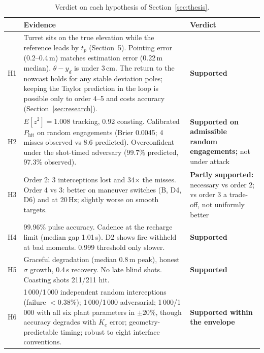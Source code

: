 \documentclass[11pt,a4paper]{article}
\newcommand{\Phit}{P_{\mathrm{hit}}}
\begin{document}
\begin{table}[H]
\centering\small
\caption{Verdict on each hypothesis of Section~\ref{sec:thesis}.}
\label{tab:verdict}
\begin{tabularx}{\textwidth}{@{}lXl@{}}
\toprule
& Evidence & Verdict\\
\midrule
H1 & Turret sits on the true elevation while the reference leads by $t_p$ (Section~5). Pointing error (0.2--0.4\,m) matches estimation error (0.22\,m median). $\theta-y_d$ is under 3\,cm. The return to the nowcast holds for any stable deviation poles; keeping the Taylor prediction in the loop is possible only to order 4--5 and costs accuracy (Section~\ref{sec:research}). & \textbf{Supported}\\
H2 & $E[z^2]=1.008$ tracking, 0.92 coasting. Calibrated $\Phit$ on random engagements (Brier 0.0045; 4 misses observed vs 8.6 predicted). Overconfident under the shot-timed adversary (99.7\% predicted, 97.3\% observed). & \textbf{Supported on admissible random engagements;} not under attack\\
H3 & Order 2: 3 interceptions lost and 34$\times$ the misses. Order 4 vs 3: better on maneuver switches (B, D4, D6) and at 20\,Hz; slightly worse on smooth targets. & \textbf{Partly supported:} necessary vs order 2; vs order 3 a trade-off, not uniformly better\\
H4 & 99.96\% pulse accuracy. Cadence at the recharge limit (median gap 1.01\,s). D2 shows fire withheld at bad moments. 0.999 threshold only slower. & \textbf{Supported}\\
H5 & Graceful degradation (median 0.8\,m peak), honest $\sigma$ growth, 0.4\,s recovery. No late blind shots. Coasting shots 211/211 hit. & \textbf{Supported}\\
H6 & 1\,000/1\,000 independent random interceptions (failure $<0.38\%$); 1\,000/1\,000 adversarial; 1\,000/1\,000 with all six plant parameters in $\pm20\%$, though accuracy degrades with $K_e$ error; geometry-predictable timing; robust to eight interface conventions. & \textbf{Supported within the envelope}\\
\bottomrule
\end{tabularx}
\end{table}
\end{document}
